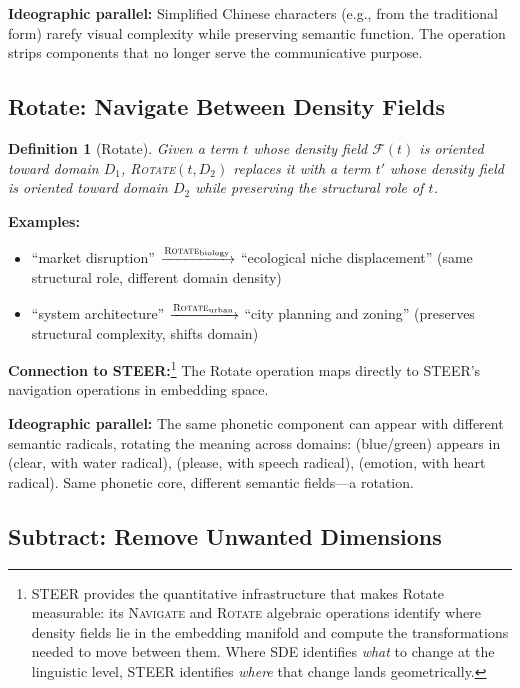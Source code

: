 \documentclass[12pt,a4paper]{article}
\newtheorem{definition}{Definition}[section]
\begin{document}
\textbf{Ideographic parallel:}
Simplified Chinese characters (e.g.,  from the traditional form) rarefy visual complexity while preserving semantic function.
The operation strips components that no longer serve the communicative purpose.

\subsection{Rotate: Navigate Between Density Fields}
\label{subsec:rotate}

\begin{definition}[Rotate]
Given a term $t$ whose density field $\mathcal{F}(t)$ is oriented toward domain $D_1$, \textsc{Rotate}$(t, D_2)$ replaces it with a term $t'$ whose density field is oriented toward domain $D_2$ while preserving the structural role of $t$.
\end{definition}

\textbf{Examples:}
\begin{itemize}
  \item ``market disruption'' $\xrightarrow{\textsc{Rotate}_{\text{biology}}}$ ``ecological niche displacement'' (same structural role, different domain density)
  \item ``system architecture'' $\xrightarrow{\textsc{Rotate}_{\text{urban}}}$ ``city planning and zoning'' (preserves structural complexity, shifts domain)
\end{itemize}

\textbf{Connection to STEER:}\footnote{STEER \cite{gomes2026steer} provides the quantitative infrastructure that makes Rotate measurable: its \textsc{Navigate} and \textsc{Rotate} algebraic operations identify where density fields lie in the embedding manifold and compute the transformations needed to move between them. Where SDE identifies \textit{what} to change at the linguistic level, STEER identifies \textit{where} that change lands geometrically.}
The Rotate operation maps directly to STEER's navigation operations in embedding space.

\textbf{Ideographic parallel:}
The same phonetic component can appear with different semantic radicals, rotating the meaning across domains:  (blue/green) appears in  (clear, with water radical),  (please, with speech radical),  (emotion, with heart radical).
Same phonetic core, different semantic fields---a rotation.

\subsection{Subtract: Remove Unwanted Dimensions}
\label{subsec:subtract}
\end{document}
